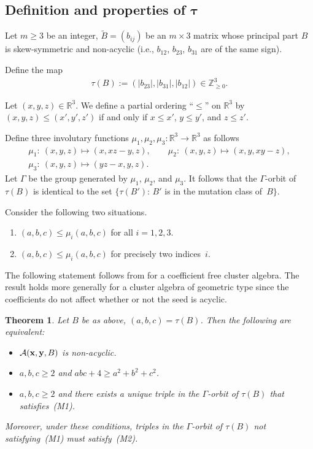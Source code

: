 \documentclass[pdftex]{sigma}
\numberwithin{equation}{section}
\newtheorem{Theorem}{Theorem}[section]
\begin{document}
\subsection[Def\/inition and properties of $\tau$]{Def\/inition and properties of $\boldsymbol{\tau}$}\label{section4.1}

Let  $m\geq 3$ be an integer, $\tilde{B}=(b_{ij})$ be an $m \times 3$ matrix whose principal part $B$ is skew-symmetric and non-acyclic (i.e., $b_{12}$, $b_{23}$, $b_{31}$ are of the same sign).

Def\/ine the map
\begin{gather*}
\tau(B):=(|b_{23}|,|b_{31}|,|b_{12}|)\in \mathbb{Z}^3_{\geq 0}.
\end{gather*}

\begin{Definition}
 Let $(x,y,z) \in \mathbb{R}^3$. We def\/ine a partial ordering ``$\le$'' on  $\mathbb{R}^3$ by $(x,y,z) \leq (x',y',z')$ if and only if $x \leq x'$, $y \leq y'$, and $z \leq z'$.
\end{Definition}

Def\/ine three involutary functions $\mu_1,\mu_2,\mu_3\colon \mathbb{R}^3\to\mathbb{R}^3$ as follows
\begin{gather*}
\mu_1\colon \ (x,y,z)\mapsto (x,xz-y,z), \qquad \mu_2\colon \ (x,y,z) \mapsto  (x,y,xy-z),
\\
\mu_3\colon \  (x,y,z) \mapsto(yz-x,y,z).
\end{gather*}
Let $\Gamma$ be the group generated by $\mu_1$, $\mu_2$, and $\mu_3$.  It follows that the $\Gamma$-orbit of $\tau(B)$ is identical to the set $\{\tau(B')$: $B'$ is in the mutation class of~$B \}$.

 Consider the following two situations.
\begin{enumerate}\itemsep=0pt
\item[(M1)] $(a,b,c)\leq \mu_i(a,b,c)$ for all $i=1,2,3$.
\item[(M2)] $(a,b,c)\leq \mu_i(a,b,c)$ for precisely two indices~$i$.
\end{enumerate}

The following statement follows from \cite[Theorem~1.2, Lemma~2.1]{BBH} for a coef\/f\/icient free cluster algebra. The result holds more generally for a cluster algebra of geometric type since the coef\/f\/icients do not af\/fect whether or not the seed is acyclic.
\begin{Theorem}
\label{cyclic}
Let $B$ be as above, $(a,b,c)=\tau(B)$. Then the following are equivalent:
\begin{itemize}\itemsep=0pt
\item[\rm(i)]$\mathcal{A}({\bf x},{\bf y},B)$ is non-acyclic.

\item[\rm(ii)] $a,b,c \geq 2$ and $abc+4\ge a^2+b^2+c^2$.

\item[\rm(iii)] $a,b,c\ge 2$ and there exists a unique triple in the $\Gamma$-orbit of $\tau(B)$ that satisfies~{\rm(M1)}.
\end{itemize}
Moreover, under these conditions, triples in the $\Gamma$-orbit of $\tau(B)$ not satisfying~{\rm(M1)} must sa\-tis\-fy~{\rm(M2)}.
\end{Theorem}
\end{document}
